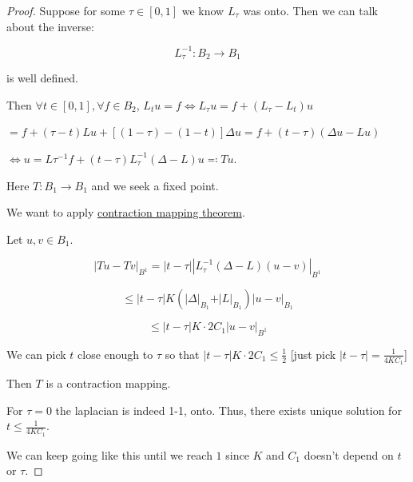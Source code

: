 \documentclass{article}
\theoremstyle{definition}
\begin{document}
\begin{proof}
    Suppose for some \(\tau \in [0,1]\) we know \(L_{\tau} \) was onto. Then we can talk about the inverse:

    \[
        L_{\tau} ^{-1} : B_2 \to B_1
    \]

    is well defined.

    Then \(\forall t \in [0,1], \forall f\in B_2\), \(L_t u = f \iff L_{\tau} u = f + (L_{\tau} - L_t)u \) 

    \(= f + (\tau-t)Lu + [(1-\tau)-(1-t)]\Delta u = f + (t-\tau)(\Delta u - Lu)\)
    
    \(\iff u = L \tau ^{-1} f + (t-\tau) L_{\tau}^{-1} (\Delta - L) u \eqqcolon Tu\).

    Here \(T: B_1 \to B_1\) and we seek a fixed point.
    
    We want to apply \underline{contraction mapping theorem}.
    
    Let \(u,v\in B_1\).

    \[
        \left\vert Tu - Tv \right\vert _{B^1} =\vert t - \tau \vert \left\vert L_{\tau} ^{-1} (\Delta  - L)(u-v) \right\vert _{B^1}
    \]

    \[
        \leq \vert t-\tau \vert K \left( \vert \Delta \vert_{B_1} + \vert L \vert_{B_1} \right) \vert u-v \vert_{B_1} 
    \]

    \[
        \leq \vert t - \tau \vert K \cdot 2 C_1 \vert u-v \vert_{B^1}
    \]

    We can pick \(t\) close enough to \(\tau \) so that \(\vert t-\tau \vert K \cdot 2C_1 \leq \frac{1}{2}\) [just pick \(\vert t-\tau \vert = \frac{1}{4KC_1}\)]

    Then \(T\) is a contraction mapping. 

    For \(\tau = 0\) the laplacian is indeed 1-1, onto. Thus, there exists unique solution for \(t \leq \frac{1}{4KC_1}\).
    
    We can keep going like this until we reach \(1\) since \(K\) and \(C_1\) doesn't depend on \(t\) or \(\tau\).

\end{proof}
\end{document}
